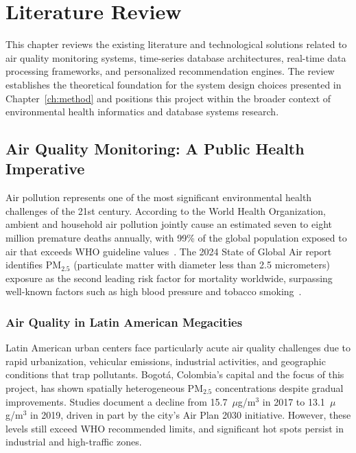 \chapter{Literature Review}
\label{ch:lit_rev}

This chapter reviews the existing literature and technological solutions related to air quality monitoring systems, time-series database architectures, real-time data processing frameworks, and personalized recommendation engines. The review establishes the theoretical foundation for the system design choices presented in Chapter~\ref{ch:method} and positions this project within the broader context of environmental health informatics and database systems research.

\section{Air Quality Monitoring: A Public Health Imperative}
\label{sec:lit_aq_health}

Air pollution represents one of the most significant environmental health challenges of the 21st century. According to the World Health Organization, ambient and household air pollution jointly cause an estimated seven to eight million premature deaths annually, with 99\% of the global population exposed to air that exceeds WHO guideline values~\citep{whopollution}. The 2024 State of Global Air report identifies PM$_{2.5}$ (particulate matter with diameter less than 2.5 micrometers) exposure as the second leading risk factor for mortality worldwide, surpassing well-known factors such as high blood pressure and tobacco smoking~\citep{state}.

\subsection{Air Quality in Latin American Megacities}
\label{subsec:lit_latam}

Latin American urban centers face particularly acute air quality challenges due to rapid urbanization, vehicular emissions, industrial activities, and geographic conditions that trap pollutants. Bogotá, Colombia's capital and the focus of this project, has shown spatially heterogeneous PM$_{2.5}$ concentrations despite gradual improvements. Studies document a decline from 15.7~$\mu$g/m$^3$ in 2017 to 13.1~$\mu$g/m$^3$ in 2019, driven in part by the city's Air Plan 2030 initiative. However, these levels still exceed WHO recommended limits, and significant hot spots persist in industrial and high-traffic zones.

